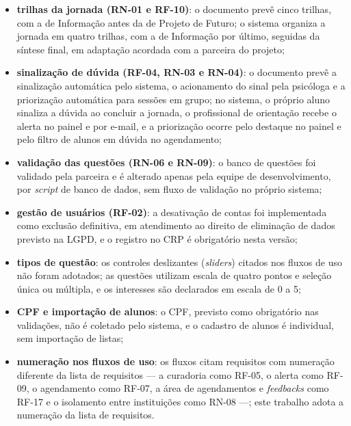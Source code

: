 \begin{apendicesenv}
\begin{itemize}
  \item \textbf{trilhas da jornada (RN-01 e RF-10)}: o documento prevê cinco trilhas, com a de Informação antes da de Projeto de Futuro; o sistema organiza a jornada em quatro trilhas, com a de Informação por último, seguidas da síntese final, em adaptação acordada com a parceira do projeto;
  \item \textbf{sinalização de dúvida (RF-04, RN-03 e RN-04)}: o documento prevê a sinalização automática pelo sistema, o acionamento do sinal pela psicóloga e a priorização automática para sessões em grupo; no sistema, o próprio aluno sinaliza a dúvida ao concluir a jornada, o profissional de orientação recebe o alerta no painel e por e-mail, e a priorização ocorre pelo destaque no painel e pelo filtro de alunos em dúvida no agendamento;
  \item \textbf{validação das questões (RN-06 e RN-09)}: o banco de questões foi validado pela parceira e é alterado apenas pela equipe de desenvolvimento, por \textit{script} de banco de dados, sem fluxo de validação no próprio sistema;
  \item \textbf{gestão de usuários (RF-02)}: a desativação de contas foi implementada como exclusão definitiva, em atendimento ao direito de eliminação de dados previsto na LGPD, e o registro no CRP é obrigatório nesta versão;
  \item \textbf{tipos de questão}: os controles deslizantes (\textit{sliders}) citados nos fluxos de uso não foram adotados; as questões utilizam escala de quatro pontos e seleção única ou múltipla, e os interesses são declarados em escala de 0 a 5;
  \item \textbf{CPF e importação de alunos}: o CPF, previsto como obrigatório nas validações, não é coletado pelo sistema, e o cadastro de alunos é individual, sem importação de listas;
  \item \textbf{numeração nos fluxos de uso}: os fluxos citam requisitos com numeração diferente da lista de requisitos --- a curadoria como RF-05, o alerta como RF-09, o agendamento como RF-07, a área de agendamentos e \textit{feedbacks} como RF-17 e o isolamento entre instituições como RN-08 ---; este trabalho adota a numeração da lista de requisitos.
\end{itemize}




\end{apendicesenv}
